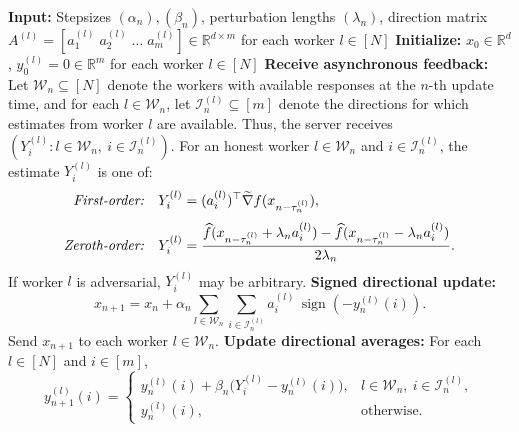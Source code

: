 \documentclass{article}
\DeclareMathOperator*{\sign}{sign}
\newcommand{\farsign}{FAR-SIGN\xspace}
\newcommand{\cI}{\mathcal{I}}
\newcommand{\cW}{\mathcal{W}}
\begin{document}
\begin{algorithm}[t]
\caption{\farsign}
\label{alg:R-SIGN_Pseudocode}
\begin{algorithmic}[1]
    \STATE \textbf{Input:} Stepsizes $(\alpha_n),(\beta_n)$, perturbation lengths $(\lambda_n)$, direction matrix
    $A^{(l)}=[a_1^{(l)}\; a_2^{(l)}\; \ldots\; a_m^{(l)}]\in\mathbb{R}^{d\times m}$ for each worker $l\in[N]$
    \STATE \textbf{Initialize:} $x_0\in\mathbb{R}^d$, $y_0^{(l)}=0\in\mathbb{R}^m$ for each worker $l\in[N]$
        \STATE \textbf{Receive asynchronous feedback:} Let $\cW_n\subseteq[N]$ denote the workers with available responses at the $n$-th update time, and for each $l\in\cW_n$, let $\cI_n^{(l)}\subseteq[m]$ denote the directions for which estimates from worker $l$ are available. Thus, the server receives $(Y_i^{(l)}:l\in\cW_n,\ i \in \cI_n^{(l)})$.
        \STATE For an honest worker $l\in\cW_n$ and $i \in \cI_n^{(l)}$, the estimate $Y_i^{(l)}$ is one of:
        \[
        \begin{aligned}
        \text{\emph{First-order:}}\quad
        Y_i^{(l)}
        &=
        ({a_i^{(l)}})^\top \widetilde{\nabla} f(x_{n-\tau_n^{(l)}}),
        \\[0.75ex]
        \text{\emph{Zeroth-order:}}\quad
        Y_i^{(l)}
        &=
        \frac{
        \widehat f(x_{n-\tau_n^{(l)}}+\lambda_n a_i^{(l)})
        -
        \widehat f(x_{n-\tau_n^{(l)}}-\lambda_n a_i^{(l)})
        }{2\lambda_n}.
        \end{aligned}
        \]
        \STATE If worker $l$ is adversarial, $Y_i^{(l)}$ may be arbitrary. 
        \STATE \textbf{Signed directional update:}
        \[
        x_{n+1}
        =
        x_n
        +
        \alpha_n
        \sum_{l\in\cW_n}
        \sum_{i \in \cI_n^{(l)}}
        a_i^{(l)}\,\sign\!\left(-y_n^{(l)}(i)\right).
        \]
        \STATE Send $x_{n+1}$ to each worker $l\in\cW_n$.
        \STATE \textbf{Update directional averages:}
        For each $l\in[N]$ and $i\in[m]$,
        \[
        y_{n+1}^{(l)}(i)
        =
        \begin{cases}
        y_n^{(l)}(i)+\beta_n\bigl(Y_i^{(l)}-y_n^{(l)}(i)\bigr),
        & l\in\cW_n,\ i\in \cI_n^{(l)},\\
        y_n^{(l)}(i),
        & \text{otherwise.}
        \end{cases}
        \]
    \ENDFOR
\end{algorithmic}
\end{algorithm}
\end{document}
